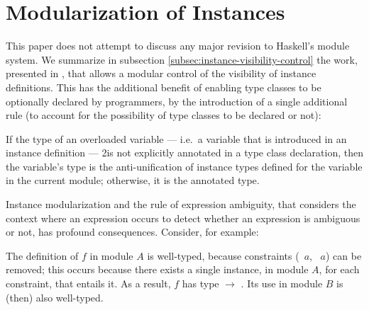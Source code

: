\section{Modularization of Instances}
\label{sec:modular-instances}

This paper does not attempt to discuss any major revision to Haskell's
module system. We summarize in subsection
\ref{subsec:instance-visibility-control} the work, presented in
\cite{Controlling-scope-instances}, that allows a modular control of
the visibility of instance definitions. This has the additional
benefit of enabling type classes to be optionally declared by
programmers, by the introduction of a single additional rule (to
account for the possibility of type classes to be declared or not):

\begin{definition}

If the type of an overloaded variable --- i.e.~a variable that is
introduced in an instance definition --- 2is not explicitly annotated in a
type class declaration, then the variable's type is the
anti-unification of instance types defined for the variable in the
current module; otherwise, it is the annotated type.

\label{overloaded-variable-type}
\end{definition}

Instance modularization and the rule of expression ambiguity, that
considers the context where an expression occurs to detect whether an
expression is ambiguous or not, has profound consequences. Consider,
for example:


The definition of $f$ in module $A$ is well-typed, because constraints
(\SShow\ $a$, \RRead\ $a$) can be removed; this occurs because there
exists a single instance, in module $A$, for each constraint, that
entails it. As a result, $f$ has type \String $\rightarrow$
\String. Its use in module $B$ is (then) also well-typed.

